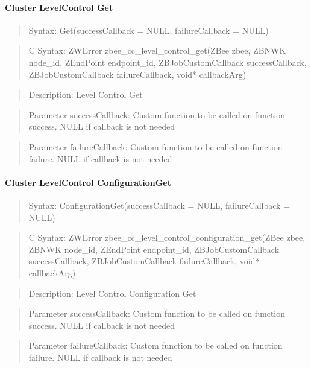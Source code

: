 \paragraph{Cluster LevelControl Get}
\begin{quote}Syntax: Get(successCallback = NULL, failureCallback = NULL)\end{quote}
\begin{quote}C Syntax: ZWError zbee\_cc\_level\_control\_get(ZBee zbee, ZBNWK node\_id, ZEndPoint endpoint\_id, ZBJobCustomCallback successCallback, ZBJobCustomCallback failureCallback, void* callbackArg)\end{quote}
\begin{quote}Description: Level Control Get\end{quote}
\begin{quote}Parameter successCallback: Custom function to be called on function success. NULL if callback is not needed\end{quote}
\begin{quote}Parameter failureCallback: Custom function to be called on function failure. NULL if callback is not needed\end{quote}


\paragraph{Cluster LevelControl ConfigurationGet}
\begin{quote}Syntax: ConfigurationGet(successCallback = NULL, failureCallback = NULL)\end{quote}
\begin{quote}C Syntax: ZWError zbee\_cc\_level\_control\_configuration\_get(ZBee zbee, ZBNWK node\_id, ZEndPoint endpoint\_id, ZBJobCustomCallback successCallback, ZBJobCustomCallback failureCallback, void* callbackArg)\end{quote}
\begin{quote}Description: Level Control Configuration Get\end{quote}
\begin{quote}Parameter successCallback: Custom function to be called on function success. NULL if callback is not needed\end{quote}
\begin{quote}Parameter failureCallback: Custom function to be called on function failure. NULL if callback is not needed\end{quote}


